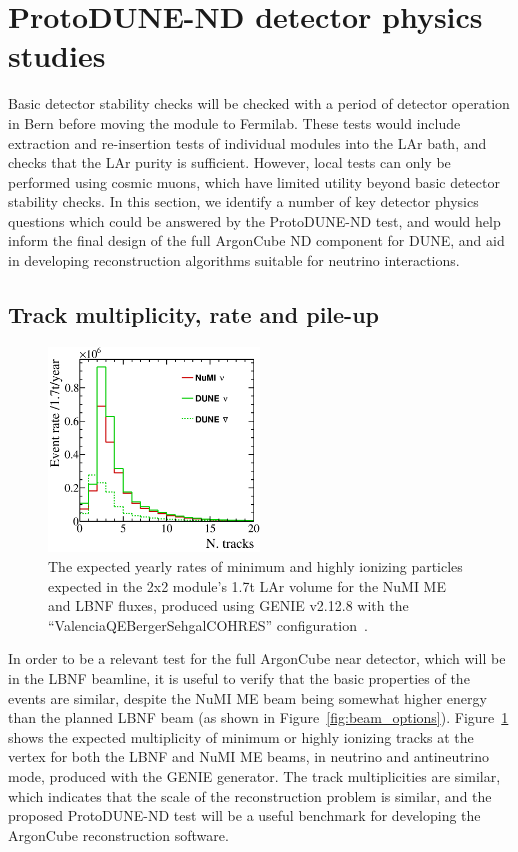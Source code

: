 \section{ProtoDUNE-ND detector physics studies}
\label{sec:detector-physics-studies}
Basic detector stability checks will be checked with a period of detector operation in Bern before moving the module to Fermilab. These tests would include extraction and re-insertion tests of individual modules into the LAr bath, and checks that the LAr purity is sufficient. However, local tests can only be performed using cosmic muons, which have limited utility beyond basic detector stability checks. In this section, we identify a number of key detector physics questions which could be answered by the ProtoDUNE-ND test, and would help inform the final design of the full ArgonCube ND component for DUNE, and aid in developing reconstruction algorithms suitable for neutrino interactions. 
\subsection{Track multiplicity, rate and pile-up}
\begin{figure}[htb]
  \centering
  \includegraphics[width=0.5\textwidth]{plots/2x2_ntracks_all.png}
  \caption{The expected yearly rates of minimum and highly ionizing particles expected in the 2x2 module's 1.7t LAr volume for the NuMI ME and LBNF fluxes, produced using GENIE v2.12.8 with the ``ValenciaQEBergerSehgalCOHRES'' configuration~\cite{genie}.}
  \label{fig:track_multiplicity}
\end{figure}
In order to be a relevant test for the full ArgonCube near detector, which will be in the LBNF beamline, it is useful to verify that the basic properties of the events are similar, despite the NuMI ME beam being somewhat higher energy than the planned LBNF beam (as shown in Figure~\ref{fig:beam_options}). Figure~\ref{fig:track_multiplicity} shows the expected multiplicity of minimum or highly ionizing tracks at the vertex for both the LBNF and NuMI ME beams, in neutrino and antineutrino mode, produced with the GENIE generator. The track multiplicities are similar, which indicates that the scale of the reconstruction problem is similar, and the proposed ProtoDUNE-ND test will be a useful benchmark for developing the ArgonCube reconstruction software.

